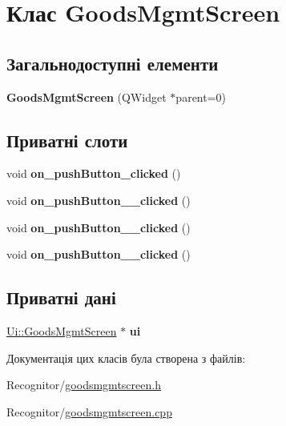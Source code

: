 \hypertarget{classGoodsMgmtScreen}{\section{Клас Goods\-Mgmt\-Screen}
\label{classGoodsMgmtScreen}
}
\subsection*{Загальнодоступні елементи}
\begin{DoxyCompactItemize}
\item 
\hypertarget{classGoodsMgmtScreen_a23df1d60103959e1b6fc32852aec9873}{{\bfseries Goods\-Mgmt\-Screen} (Q\-Widget $\ast$parent=0)}\label{classGoodsMgmtScreen_a23df1d60103959e1b6fc32852aec9873}

\end{DoxyCompactItemize}
\subsection*{Приватні слоти}
\begin{DoxyCompactItemize}
\item 
\hypertarget{classGoodsMgmtScreen_af6b7ddc269f16db33def62a0c088cd72}{void {\bfseries on\-\_\-push\-Button\-\_\-clicked} ()}\label{classGoodsMgmtScreen_af6b7ddc269f16db33def62a0c088cd72}

\item 
\hypertarget{classGoodsMgmtScreen_ad7e09acd2978457ccba9ca4829218837}{void {\bfseries on\-\_\-push\-Button\-\_\-\_\-clicked} ()}\label{classGoodsMgmtScreen_ad7e09acd2978457ccba9ca4829218837}

\item 
\hypertarget{classGoodsMgmtScreen_a8ad921cd256c2847ae9505619ea05e31}{void {\bfseries on\-\_\-push\-Button\-\_\-\_\-clicked} ()}\label{classGoodsMgmtScreen_a8ad921cd256c2847ae9505619ea05e31}

\item 
\hypertarget{classGoodsMgmtScreen_a28787cbd6ab01f8b874983658c27b39b}{void {\bfseries on\-\_\-push\-Button\-\_\-\_\-clicked} ()}\label{classGoodsMgmtScreen_a28787cbd6ab01f8b874983658c27b39b}

\end{DoxyCompactItemize}
\subsection*{Приватні дані}
\begin{DoxyCompactItemize}
\item 
\hypertarget{classGoodsMgmtScreen_ac3a8443017075cfa943106952464f494}{\hyperlink{classUi_1_1GoodsMgmtScreen}{Ui\-::\-Goods\-Mgmt\-Screen} $\ast$ {\bfseries ui}}\label{classGoodsMgmtScreen_ac3a8443017075cfa943106952464f494}

\end{DoxyCompactItemize}


Документація цих класів була створена з файлів\-:\begin{DoxyCompactItemize}
\item 
Recognitor/\hyperlink{goodsmgmtscreen_8h}{goodsmgmtscreen.\-h}\item 
Recognitor/\hyperlink{goodsmgmtscreen_8cpp}{goodsmgmtscreen.\-cpp}\end{DoxyCompactItemize}

